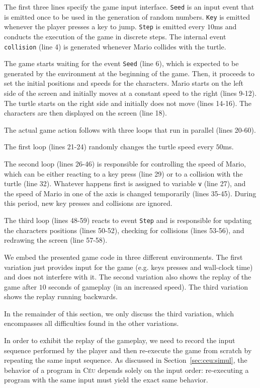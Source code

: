 \documentclass{sigplan-proc}
\newcommand{\2}{\;\;}
\newcommand{\5}{\;\;\;\;\;}
\newcommand{\CEU}{\textsc{C\'{e}u}}
\newcommand{\code}[1] {{\small{\texttt{#1}}}}
\begin{document}

The first three lines specify the game input interface.
\code{Seed} is an input event that is emitted once to be used in the generation 
of random numbers.
\code{Key} is emitted whenever the player presses a key to jump.
\code{Step} is emitted every $10$ms and conducts the execution of the game in 
discrete steps.
The internal event \code{collision} (line 4) is generated whenever Mario 
collides with the turtle.

The game starts waiting for the event \code{Seed} (line 6), which is expected 
to be generated by the environment at the beginning of the game.
Then, it proceeds to set the initial positions and speeds for the characters.
Mario starts on the left side of the screen and initially moves at a constant 
speed to the right (lines 9-12).
The turtle starts on the right side and initially does not move (lines 14-16).
The characters are then displayed on the screen (line 18).

The actual game action follows with three loops that run in parallel (lines 
20-60).

The first loop (lines 21-24) randomly changes the turtle speed every $50$ms.

The second loop (lines 26-46) is responsible for controlling the speed of 
Mario, which can be either reacting to a key press (line 29) or to a collision 
with the turtle (line 32).
Whatever happens first is assigned to variable \code{v} (line 27), and the 
speed of Mario in one of the axis is changed temporarily (lines 35-45).
During this period, new key presses and collisions are ignored.

The third loop (lines 48-59) reacts to event \code{Step} and is responsible for 
updating the characters positions (lines 50-52), checking for collisions (lines 
53-56), and redrawing the screen (line 57-58).

We embed the presented game code in three different environments.
The first variation just provides input for the game (e.g. keys presses and 
wall-clock time) and does not interfere with it.
The second variation also shows the replay of the game after $10$ seconds of 
gameplay (in an increased speed).
The third variation shows the replay running backwards.

In the remainder of this section, we only discuss the third variation, which 
encompasses all difficulties found in the other variations.

In order to exhibit the replay of the gameplay, we need to record the input 
sequence performed by the player and then re-execute the game from scratch by 
repeating the same input sequence.
As discussed in Section~\ref{sec:ceu:simul}, the behavior of a program in 
\CEU{} depends solely on the input order: re-executing a program with the same 
input must yield the exact same behavior.
\end{document}

